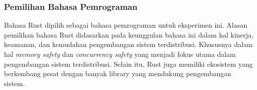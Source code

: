 \subsubsection{Pemilihan Bahasa Pemrograman}
\label{subsubsection:pilihan-bahasa-pemrograman}

Bahasa Rust dipilih sebagai bahasa pemrograman untuk eksperimen ini. Alasan pemilihan bahasa Rust didasarkan pada keunggulan bahasa ini dalam hal kinerja, keamanan, dan kemudahan pengembangan sistem terdistribusi. Khususnya dalam hal \textit{memory safety} dan \textit{concurrency safety} yang menjadi fokus utama dalam pengembangan sistem terdistribusi. Selain itu, Rust juga memiliki ekosistem yang berkembang pesat dengan banyak library yang mendukung pengembangan sistem.
